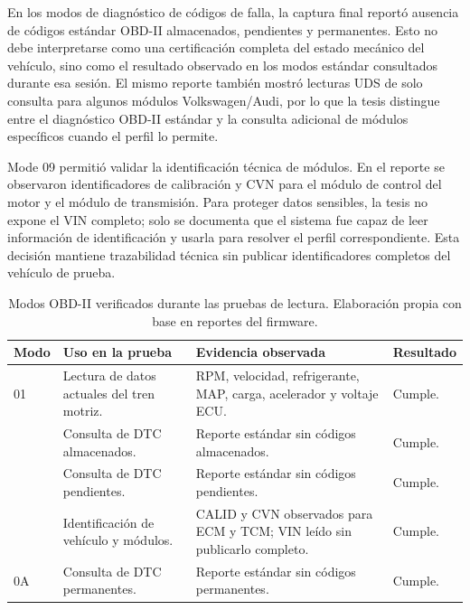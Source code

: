 \documentclass[12pt,letterpaper]{report}
\begin{document}
En los modos de diagnóstico de códigos de falla, la captura final reportó ausencia de códigos estándar OBD-II almacenados, pendientes y permanentes. Esto no debe interpretarse como una certificación completa del estado mecánico del vehículo, sino como el resultado observado en los modos estándar consultados durante esa sesión. El mismo reporte también mostró lecturas UDS de solo consulta para algunos módulos Volkswagen/Audi, por lo que la tesis distingue entre el diagnóstico OBD-II estándar y la consulta adicional de módulos específicos cuando el perfil lo permite.

Mode 09 permitió validar la identificación técnica de módulos. En el reporte se observaron identificadores de calibración y CVN para el módulo de control del motor y el módulo de transmisión. Para proteger datos sensibles, la tesis no expone el VIN completo; solo se documenta que el sistema fue capaz de leer información de identificación y usarla para resolver el perfil correspondiente. Esta decisión mantiene trazabilidad técnica sin publicar identificadores completos del vehículo de prueba.

\begin{table}[!htbp]
\centering
\scriptsize
\caption{Modos OBD-II verificados durante las pruebas de lectura. Elaboración propia con base en reportes del firmware.}
\label{tab:obd-mode-tests}
\begin{tabular}{@{}p{}p{}p{}p{}@{}}
\toprule
\textbf{Modo} & \textbf{Uso en la prueba} & \textbf{Evidencia observada} & \textbf{Resultado} \\
\midrule
01 & Lectura de datos actuales del tren motriz. & RPM, velocidad, refrigerante, MAP, carga, acelerador y voltaje ECU. & Cumple. \\
\addlinespace
03 & Consulta de DTC almacenados. & Reporte estándar sin códigos almacenados. & Cumple. \\
\addlinespace
07 & Consulta de DTC pendientes. & Reporte estándar sin códigos pendientes. & Cumple. \\
\addlinespace
09 & Identificación de vehículo y módulos. & CALID y CVN observados para ECM y TCM; VIN leído sin publicarlo completo. & Cumple. \\
\addlinespace
0A & Consulta de DTC permanentes. & Reporte estándar sin códigos permanentes. & Cumple. \\
\bottomrule
\end{tabular}
\end{table}
\end{document}
